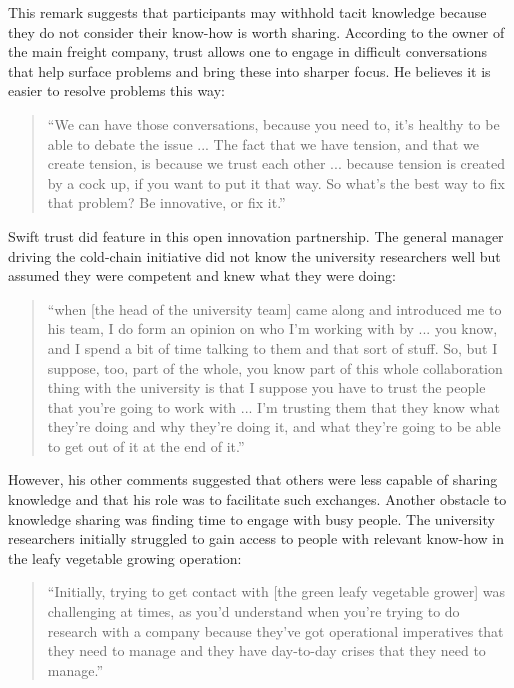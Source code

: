 This remark suggests that participants may withhold tacit knowledge because they do not consider their know-how is worth sharing. According to the owner of the main freight company, trust allows one to engage in difficult conversations that help surface problems and bring these into sharper focus. He believes it is easier to resolve problems this way:   

\begin{quote}
\small
\enquote{We can have those conversations, because you need to, it's healthy to be able to debate the issue ... The fact that we have tension, and that we create tension, is because we trust each other ... because tension is created by a cock up, if you want to put it that way. So what's the best way to fix that problem? Be innovative, or fix it.} \\
\end{quote}

Swift trust did feature in this open innovation partnership. The general manager driving the cold-chain initiative did not know the university researchers well but assumed they were competent and knew what they were doing:

\begin{quote}
\small
\enquote{when [the head of the university team] came along and introduced me to his team, I do form an opinion on who I'm working with by ... you know, and I spend a bit of time talking to them and that sort of stuff. So, but I suppose, too, part of the whole, you know part of this whole collaboration thing with the university is that I suppose you have to trust the people that you’re going to work with ... I'm trusting them that they know what they're doing and why they're doing it, and what they're going to be able to get out of it at the end of it.} \\
\end{quote}
 
However, his other comments suggested that others were less capable of sharing knowledge and that his role was to facilitate such exchanges. Another obstacle to knowledge sharing was finding time to engage with busy people. The university researchers initially struggled to gain access to people with relevant know-how in the leafy vegetable growing operation:   

\begin{quote}
\small
\enquote{Initially, trying to get contact with [the green leafy vegetable grower] was challenging at times, as you'd understand when you're trying to do research with a company because they've got operational imperatives that they need to manage and they have day-to-day crises that they need to manage.} \\
\end{quote}

